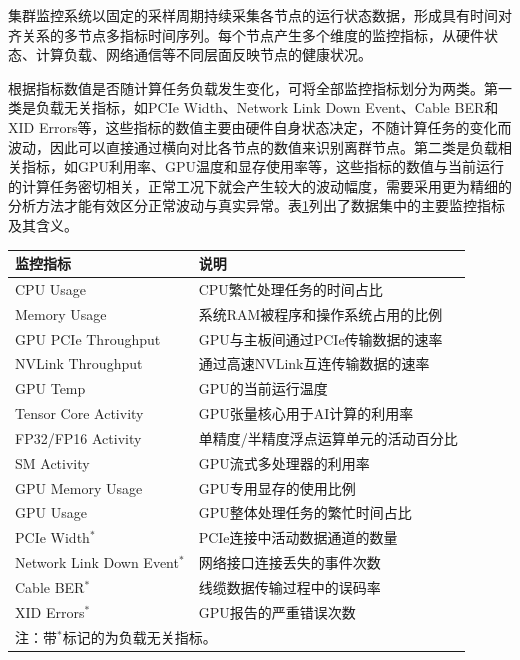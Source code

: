 \FloatBarrier

集群监控系统以固定的采样周期持续采集各节点的运行状态数据，形成具有时间对齐关系的多节点多指标时间序列。每个节点产生多个维度的监控指标，从硬件状态、计算负载、网络通信等不同层面反映节点的健康状况。

根据指标数值是否随计算任务负载发生变化，可将全部监控指标划分为两类。第一类是负载无关指标，如PCIe Width、Network Link Down Event、Cable BER和XID Errors等，这些指标的数值主要由硬件自身状态决定，不随计算任务的变化而波动，因此可以直接通过横向对比各节点的数值来识别离群节点。第二类是负载相关指标，如GPU利用率、GPU温度和显存使用率等，这些指标的数值与当前运行的计算任务密切相关，正常工况下就会产生较大的波动幅度，需要采用更为精细的分析方法才能有效区分正常波动与真实异常。表\ref{tab:monitoring_metrics}列出了数据集中的主要监控指标及其含义。

\begin{table}[htbp]
    \centering
    \label{tab:monitoring_metrics}
    \begin{tabular}{p{5.5cm}p{8cm}}
        \toprule
        监控指标 & 说明 \\
        \midrule
        CPU Usage & CPU繁忙处理任务的时间占比 \\
        Memory Usage & 系统RAM被程序和操作系统占用的比例 \\
        GPU PCIe Throughput & GPU与主板间通过PCIe传输数据的速率 \\
        NVLink Throughput & 通过高速NVLink互连传输数据的速率 \\
        GPU Temp & GPU的当前运行温度 \\
        Tensor Core Activity & GPU张量核心用于AI计算的利用率 \\
        FP32/FP16 Activity & 单精度/半精度浮点运算单元的活动百分比 \\
        SM Activity & GPU流式多处理器的利用率 \\
        GPU Memory Usage & GPU专用显存的使用比例 \\
        GPU Usage & GPU整体处理任务的繁忙时间占比 \\
        PCIe Width$^*$ & PCIe连接中活动数据通道的数量 \\
        Network Link Down Event$^*$ & 网络接口连接丢失的事件次数 \\
        Cable BER$^*$ & 线缆数据传输过程中的误码率 \\
        XID Errors$^*$ & GPU报告的严重错误次数 \\
        \bottomrule
        \multicolumn{2}{l}{\footnotesize 注：带$^*$标记的为负载无关指标。}
    \end{tabular}
\end{table}

